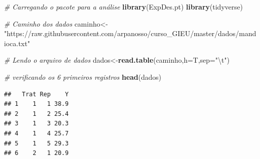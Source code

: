 \documentclass[
]{book}
\newenvironment{Shaded}{\begin{snugshade}}{\end{snugshade}}
\newcommand{\CharTok}[1]{\textcolor[rgb]{0.31,0.60,0.02}{#1}}
\newcommand{\CommentTok}[1]{\textcolor[rgb]{0.56,0.35,0.01}{\textit{#1}}}
\newcommand{\DataTypeTok}[1]{\textcolor[rgb]{0.13,0.29,0.53}{#1}}
\newcommand{\KeywordTok}[1]{\textcolor[rgb]{0.13,0.29,0.53}{\textbf{#1}}}
\newcommand{\NormalTok}[1]{#1}
\newcommand{\OperatorTok}[1]{\textcolor[rgb]{0.81,0.36,0.00}{\textbf{#1}}}
\newcommand{\StringTok}[1]{\textcolor[rgb]{0.31,0.60,0.02}{#1}}
\begin{document}
\begin{Shaded}
\begin{Highlighting}[]
\CommentTok{# Carregando o pacote para a análise}
\KeywordTok{library}\NormalTok{(ExpDes.pt)}
\KeywordTok{library}\NormalTok{(tidyverse)}


\CommentTok{# Caminho dos dados}
\NormalTok{caminho<-}\StringTok{"https://raw.githubusercontent.com/arpanosso/curso_GIEU/master/dados/mandioca.txt"}

\CommentTok{# Lendo o arquivo de dados}
\NormalTok{dados<-}\KeywordTok{read.table}\NormalTok{(caminho,}\DataTypeTok{h=}\NormalTok{T,}\DataTypeTok{sep=}\StringTok{"}\CharTok{\textbackslash{}t}\StringTok{"}\NormalTok{)}

\CommentTok{# verificando os 6 primeiros registros}
\KeywordTok{head}\NormalTok{(dados)}
\end{Highlighting}
\end{Shaded}

\begin{verbatim}
##   Trat Rep    Y
## 1    1   1 38.9
## 2    1   2 25.4
## 3    1   3 20.3
## 4    1   4 25.7
## 5    1   5 29.3
## 6    2   1 20.9
\end{verbatim}

\begin{Shaded}
\end{Shaded}
\end{document}
